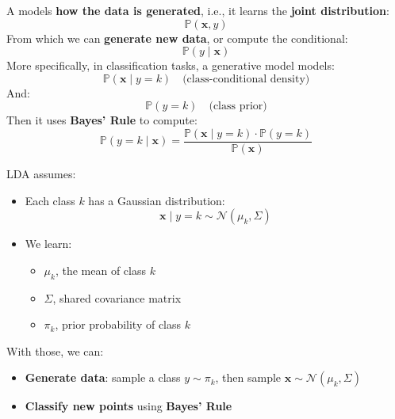 \highspace
\begin{definitionbox}
    A  models \textbf{how the data is generated}, i.e., it learns the \textbf{joint distribution}:
    \begin{equation*}
        \mathbb{P}(\mathbf{x}, y)
    \end{equation*}
    From which we can \textbf{generate new data}, or compute the conditional:
    \begin{equation*}
        \mathbb{P}(y \mid \mathbf{x})
    \end{equation*}
    More specifically, in classification tasks, a generative model models:
    \begin{equation*}
        \mathbb{P}(\mathbf{x} \mid y=k) \quad \text{(class-conditional density)}
    \end{equation*}
    And:
    \begin{equation*}
        \mathbb{P}(y = k) \quad \text{(class prior)}
    \end{equation*}
    Then it uses \textbf{Bayes' Rule} to compute:
    \begin{equation*}
        \mathbb{P}(y = k \mid \mathbf{x}) = \frac{\mathbb{P}(\mathbf{x} \mid y = k)\cdot \mathbb{P}(y = k)}{\mathbb{P}(\mathbf{x})}
    \end{equation*}

    \begin{examplebox}
        LDA assumes:
        \begin{itemize}
            \item Each class $k$ has a Gaussian distribution:
            \begin{equation*}
                \mathbf{x} \mid y = k \sim \mathcal{N}(\mu_k, \Sigma)
            \end{equation*}
            \item We learn:
            \begin{itemize}
                \item $\mu_{k}$, the mean of class $k$
                \item $\Sigma$, shared covariance matrix
                \item $\pi_{k}$, prior probability of class $k$
            \end{itemize}
        \end{itemize}
        With those, we can:
        \begin{itemize}
            \item \textbf{Generate data}: sample a class $y \sim \pi_k$, then sample $\mathbf{x} \sim \mathcal{N}\left(\mu_k, \Sigma\right)$
            \item \textbf{Classify new points} using \textbf{Bayes' Rule}
        \end{itemize}
    \end{examplebox}
\end{definitionbox}

